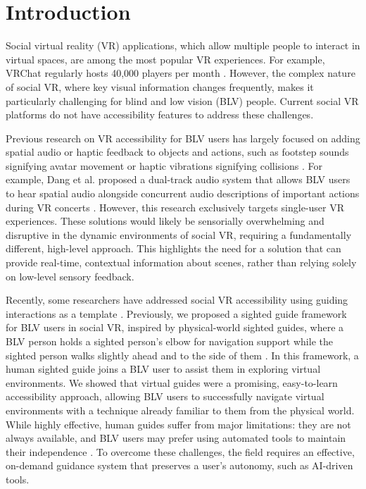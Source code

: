 \section{Introduction}
Social virtual reality (VR) applications, which allow multiple people to interact in virtual spaces, are among the most popular VR experiences. For example, VRChat regularly hosts 40,000 players per month \cite{vrchatmetrics}. However, the complex nature of social VR, where key visual information changes frequently, makes it particularly challenging for blind and low vision (BLV) people. Current social VR platforms do not have accessibility features to address these challenges.

Previous research on VR accessibility for BLV users has largely focused on adding spatial audio or haptic feedback to objects and actions, such as footstep sounds signifying avatar movement or haptic vibrations signifying collisions \cite{andrade2018echo, zhao2018cane, siu2020cane, zhang2020cane, dang2023opportunities}. For example, Dang et al. proposed a dual-track audio system that allows BLV users to hear spatial audio alongside concurrent audio descriptions of important actions during VR concerts \cite{dang2023opportunities}. However, this research exclusively targets single-user VR experiences. These solutions would likely be sensorially overwhelming and disruptive in the dynamic environments of social VR, requiring a fundamentally different, high-level approach. This highlights the need for a solution that can provide real-time, contextual information about scenes, rather than relying solely on low-level sensory feedback.

Recently, some researchers have addressed social VR accessibility using guiding interactions as a template \cite{collins2023gaze, wieland2022nvc, ji2022vrbubble, collins2023guide}. Previously, we proposed a sighted guide framework for BLV users in social VR, inspired by physical-world sighted guides, where a BLV person holds a sighted person's elbow for navigation support while the sighted person walks slightly ahead and to the side of them \cite{collins2023guide}. In this framework, a human sighted guide joins a BLV user to assist them in exploring virtual environments. We showed that virtual guides were a promising, easy-to-learn accessibility approach, allowing BLV users to successfully navigate virtual environments with a technique already familiar to them from the physical world. While highly effective, human guides suffer from major limitations: they are not always available, and BLV users may prefer using automated tools to maintain their independence \cite{collins2023guide, gonzalez2024scenedesc}. To overcome these challenges, the field requires an effective, on-demand guidance system that preserves a user’s autonomy, such as AI-driven tools.

